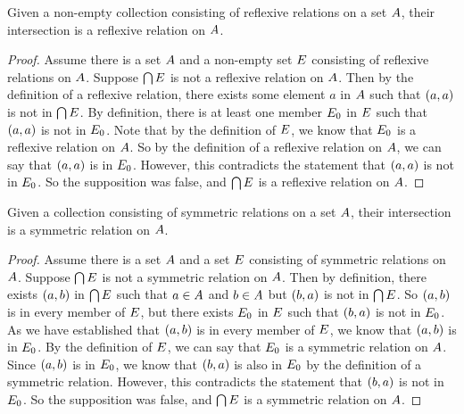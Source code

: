 \documentclass[main.tex]{subfiles}
\begin{document}
\begin{lemma}
	Given a non-empty collection consisting of reflexive relations on a set
	\({A}\), their intersection is a reflexive relation on
	\({A}\).
\end{lemma}
\begin{proof}
	Assume there is a set \({A}\) and a non-empty set \({E}\)
	consisting of reflexive relations on \({A}\). Suppose
	\(\bigcap {E}\) is not a reflexive relation on \({A}\).
	Then by the definition of a reflexive relation, there exists some
	element \(a\) in \({A}\) such that \(({a},{a})\) is not in
	\(\bigcap {E}\). By definition, there is at least one member
	\({E_0}\) in \({E}\) such that \(({a},{a})\) is not
	in \({E_0}\). Note that by the definition of \({E}\), we
	know that \({E_0}\) is a reflexive relation on \({A}\). So
	by the definition of a reflexive relation on \({A}\), we can say
	that \(({a},{a})\) is in \({E_0}\). However, this
	contradicts the statement that \(({a},{a})\) is not in
	\({E_0}\). So the supposition was false, and
	\(\bigcap {E}\) is a reflexive relation on \({A}\).
\end{proof}

\begin{lemma}
	Given a collection consisting of symmetric relations on a set
	\({A}\), their intersection is a symmetric relation on
	\({A}\).
\end{lemma}
\begin{proof}
	Assume there is a set \({A}\) and a set \({E}\) consisting
	of symmetric relations on \({A}\). Suppose
	\(\bigcap {E}\) is not a symmetric relation on \({A}\).
	Then by definition, there exists \(({a},{b})\) in
	\(\bigcap {E}\) such that \(a \in {A}\) and
	\(b \in {A}\) but \(({b},{a})\) is not in
	\(\bigcap {E}\). So \(({a},{b})\) is in every member of
	\({E}\), but there exists \({E_0}\) in \({E}\)
	such that \(({b},{a})\) is not in \({E_0}\). As we have
	established that \(({a},{b})\) is in every member of
	\({E}\), we know that \(({a},{b})\) is in \({E_0}\).
	By the definition of \({E}\), we can say that \({E_0}\) is
	a symmetric relation on \({A}\). Since \(({a},{b})\) is in
	\({E_0}\), we know that \(({b},{a})\) is also in
	\({E_0}\) by the definition of a symmetric relation. However,
	this contradicts the statement that \(({b},{a})\) is not in
	\({E_0}\). So the supposition was false, and
	\(\bigcap {E}\) is a symmetric relation on \({A}\).
\end{proof}
\end{document}

